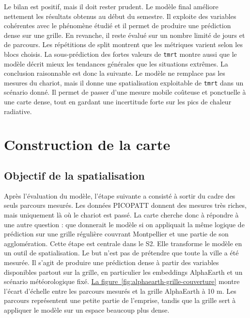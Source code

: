 \documentclass{article}
\begin{document}
Le bilan est positif, mais il doit rester prudent. Le modèle final améliore nettement les résultats obtenus au début du semestre. Il exploite des variables cohérentes avec le phénomène étudié et il permet de produire une prédiction dense sur une grille. En revanche, il reste évalué sur un nombre limité de jours et de parcours. Les répétitions de split montrent que les métriques varient selon les blocs choisis. La sous-prédiction des fortes valeurs de \texttt{tmrt} montre aussi que le modèle décrit mieux les tendances générales que les situations extrêmes.
La conclusion raisonnable est donc la suivante. Le modèle ne remplace pas les mesures du chariot, mais il donne une spatialisation exploitable de \texttt{tmrt} dans un scénario donné. Il permet de passer d'une mesure mobile coûteuse et ponctuelle à une carte dense, tout en gardant une incertitude forte sur les pics de chaleur radiative.

\newpage

\section{Construction de la carte}

\subsection{Objectif de la spatialisation}

Après l'évaluation du modèle, l'étape suivante a consisté à sortir du cadre des seuls parcours mesurés. Les données PICOPATT donnent des mesures très riches, mais uniquement là où le chariot est passé. La carte cherche donc à répondre à une autre question : que donnerait le modèle si on appliquait la même logique de prédiction sur une grille régulière couvrant Montpellier et une partie de son agglomération.
Cette étape est centrale dans le S2. Elle transforme le modèle en un outil de spatialisation. Le but n'est pas de prétendre que toute la ville a été mesurée. Il s'agit de produire une prédiction dense à partir des variables disponibles partout sur la grille, en particulier les embeddings AlphaEarth et un scénario météorologique fixé.
\hyperref[fig:alphaearth-grille-couverture]{La figure~\ref{fig:alphaearth-grille-couverture}} montre l'écart d'échelle entre les parcours mesurés et la grille AlphaEarth à 10 m. Les parcours représentent une petite partie de l'emprise, tandis que la grille sert à appliquer le modèle sur un espace beaucoup plus dense.
\end{document}
